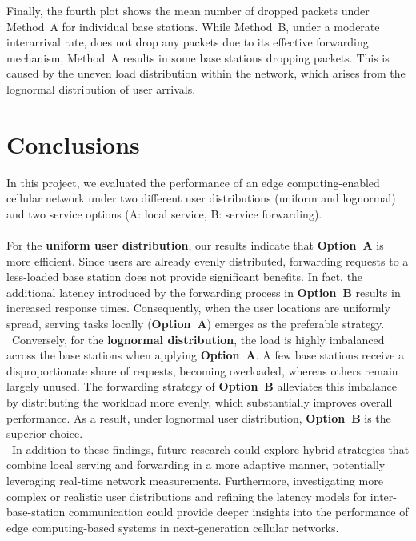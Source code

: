 \documentclass{report}
\begin{document}
\begin{flushleft}
Finally, the fourth plot shows the mean number of dropped packets under Method~A for individual base stations. While Method~B, under a moderate interarrival rate, does not drop any packets due to its effective forwarding mechanism, Method~A results in some base stations dropping packets. This is caused by the uneven load distribution within the network, which arises from the lognormal distribution of user arrivals.
\end{flushleft}

\chapter{Conclusions}
In this project, we evaluated the performance of an edge computing-enabled cellular network under two different user distributions (uniform and lognormal) and two service options (A: local service, B: service forwarding).\\\\
For the \textbf{uniform user distribution}, our results indicate that \textbf{Option~A} is more efficient.
Since users are already evenly distributed, forwarding requests to a less-loaded base station does not provide significant benefits.
In fact, the additional latency introduced by the forwarding process in \textbf{Option~B} results in increased response times.
Consequently, when the user locations are uniformly spread, serving tasks locally (\textbf{Option~A}) emerges as the preferable strategy.
\\\
Conversely, for the \textbf{lognormal distribution}, the load is highly imbalanced across the base stations when applying \textbf{Option~A}.
A few base stations receive a disproportionate share of requests, becoming overloaded, whereas others remain largely unused.
The forwarding strategy of \textbf{Option~B} alleviates this imbalance by distributing the workload more evenly, which substantially improves overall performance.
As a result, under lognormal user distribution, \textbf{Option~B} is the superior choice.
\\\
In addition to these findings, future research could explore hybrid strategies that combine local serving and forwarding in a more adaptive manner, potentially leveraging real-time network measurements.
Furthermore, investigating more complex or realistic user distributions and refining the latency models for inter-base-station communication could provide deeper insights into the performance of edge computing-based systems in next-generation cellular networks.

\appendix
\end{document}
